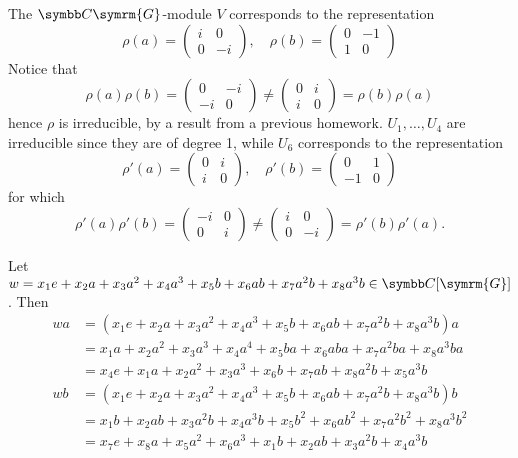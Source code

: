 \begin{solution}
The \(\complex \symrm{G}\)-module \(V\) corresponds to the representation
\[
    \rho(a) = \begin{pmatrix}
        i & 0 \\
        0 & -i
    \end{pmatrix},
    \quad
    \rho(b) = \begin{pmatrix}
        0 & -1 \\
        1 & 0
    \end{pmatrix}
\]
Notice that
\[
    \rho(a) \rho(b) = \begin{pmatrix}
        0 & -i \\
        -i & 0
    \end{pmatrix} \neq \begin{pmatrix}
        0 & i \\
        i & 0
    \end{pmatrix} = \rho(b) \rho(a)
\]
hence \(\rho\) is irreducible, by a result from a previous homework. \(U_1, \dots, U_4\) are irreducible since they are of degree 1, while \(U_6\) corresponds to the representation
\[
    \rho'(a) = \begin{pmatrix}
        0 & i \\
        i & 0
    \end{pmatrix},
    \quad
    \rho'(b) = \begin{pmatrix}
        0 & 1 \\
        -1 & 0
    \end{pmatrix}
\]
for which
\[
    \rho'(a) \rho'(b) = \begin{pmatrix}
        -i & 0 \\
        0 & i
    \end{pmatrix} \neq \begin{pmatrix}
        i & 0 \\
        0 & -i
    \end{pmatrix} = \rho'(b) \rho'(a).
\]

Let \(w = x_1 e + x_2 a + x_3 a^2 + x_4 a^3 + x_5 b + x_6 a b + x_7 a^2 b + x_8 a^3 b \in \complex[\symrm{G}]\). Then
\begin{align*}
    w a &= (x_1 e + x_2 a + x_3 a^2 + x_4 a^3 + x_5 b + x_6 a b + x_7 a^2 b + x_8 a^3 b) a \\
    &= x_1 a + x_2 a^2 + x_3 a^3 + x_4 a^4 + x_5 b a + x_6 a b a + x_7 a^2 b a + x_8 a^3 b a \\
    &= x_4 e + x_1 a + x_2 a^2 + x_3 a^3 + x_6 b + x_7 a b + x_8 a^2 b + x_5 a^3 b \\
    w b &= (x_1 e + x_2 a + x_3 a^2 + x_4 a^3 + x_5 b + x_6 a b + x_7 a^2 b + x_8 a^3 b) b \\
    &= x_1 b + x_2 a b + x_3 a^2 b + x_4 a^3 b + x_5 b^2 + x_6 a b^2 + x_7 a^2 b^2 + x_8 a^3 b^2 \\
    &= x_7 e + x_8 a + x_5 a^2 + x_6 a^3 + x_1 b + x_2 a b + x_3 a^2 b + x_4 a^3 b
\end{align*}


\end{solution}
